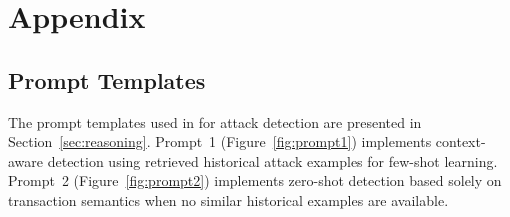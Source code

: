 \section{Appendix}
\subsection{Prompt Templates}

\label{sec:prompts}

The prompt templates used in \approach{} for attack detection are presented in Section~\ref{sec:reasoning}. Prompt~1 (Figure~\ref{fig:prompt1}) implements context-aware detection using retrieved historical attack examples for few-shot learning. Prompt~2 (Figure~\ref{fig:prompt2}) implements zero-shot detection based solely on transaction semantics when no similar historical examples are available.
